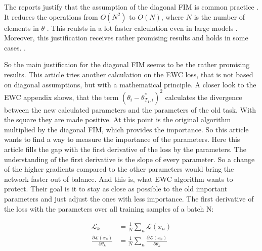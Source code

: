 The reports \cite{better-weight-consolidation,elastic-weight-consolidation} justify that the assumption of the diagonal FIM is common practice \cite{elastic-weight-consolidation,better-weight-consolidation,incremental-moment-matching}.
It reduces the operations from $O(N^2)$ to $O(N)$, where $N$ is the number of elements in $\theta$ \cite{elastic-weight-consolidation,better-weight-consolidation}.
This reulsts in a lot faster calculation even in large models \cite{elastic-weight-consolidation,better-weight-consolidation}.
Moreover, this justification receives rather promising results and holds in some cases.
\cite{elastic-weight-consolidation,incremental-moment-matching}.

So the main justificaion for the diagonal FIM seems to be the rather promising results.
\newline
This article tries another calculation on the EWC loss, that is not based on diagonal assumptions, but with a mathematical principle.
\newline
A closer look to the EWC appendix shows, that the term $(\theta_i - \theta^*_{T_1,i})^2$ calculates the divergence between the new calculated parameters and the parameters of the old task.
With the square they are made positive.
At this point is the original algorithm multiplied by the diagonal FIM, which provides the importance.
So this article wants to find a way to measure the importance of the parameters.
Here this article fills the gap with the first derivative of the loss by the parameters.
The understanding of the first derivative is the slope of every parameter.
So a change of the higher gradients compared to the other parameters would bring the network faster out of balance.
And this is, what EWC algorithm wants to protect. Their goal is it to stay as close as possible to the old important parameters and just adjust the ones with less importance.
The first derivative of the loss with the parameters over all training samples of a batch N:

\begin{equation}
    \begin{split}
        \mathcal{L}_k & = 
        \frac{1}{N}
        \sum_{n} 
            \mathcal{L}(x_n)
        \\
        \frac{\partial \mathcal{L}(x_n)}{\partial \theta_k} & = 
        \frac{1}{N}
        \sum_{n} 
            \frac{\partial \mathcal{L}(x_n)}{\partial \theta_k}
    \end{split}
\end{equation}

